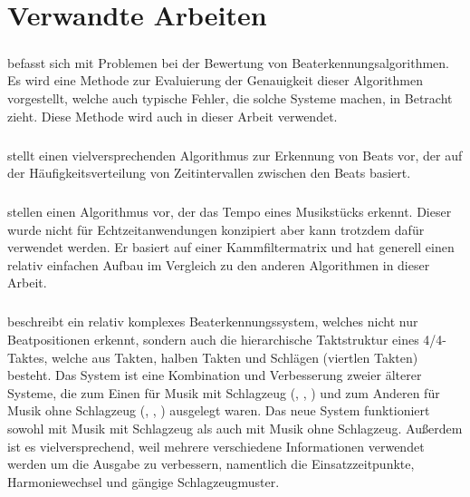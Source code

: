 \chapter{Verwandte Arbeiten}
\label{verwandte_arbeiten}

\paragraph{\cite{1997_GoMu1}}
{
	befasst sich mit Problemen bei der Bewertung von Beaterkennungsalgorithmen.
	Es wird eine Methode zur Evaluierung der Genauigkeit dieser Algorithmen vorgestellt,
		welche auch typische Fehler,
		die solche Systeme machen,
		in Betracht zieht.
	Diese Methode wird auch in dieser Arbeit verwendet.
}


\paragraph{\cite{2000_Di}}
{
	stellt einen vielversprechenden Algorithmus zur Erkennung von Beats vor,
		der auf der Häufigkeitsverteilung von Zeitintervallen zwischen den Beats basiert.
}

\paragraph{\cite{2001_BeatThis}}
{
	stellen einen Algorithmus vor,
		der das Tempo eines Musikstücks erkennt.
	Dieser wurde nicht für Echtzeitanwendungen konzipiert
		aber kann trotzdem dafür verwendet werden.
	Er basiert auf einer Kammfiltermatrix
		und hat generell einen relativ einfachen Aufbau im Vergleich zu den anderen Algorithmen in dieser Arbeit.
}

\paragraph{\cite{2001_Go}}
{
	beschreibt ein relativ komplexes Beaterkennungssystem,
		welches nicht nur Beatpositionen erkennt,
		sondern auch die hierarchische Taktstruktur eines 4/4-Taktes,
		welche aus Takten, halben Takten und Schlägen (viertlen Takten) besteht.
	Das System ist eine Kombination und Verbesserung zweier älterer Systeme,
		die zum Einen für Musik mit Schlagzeug (\cite{1994_GoMu}, \cite{1995_GoMu1}, \cite{1998_GoMu})
		und zum Anderen für Musik ohne Schlagzeug (\cite{1996_GoMu}, \cite{1997_GoMu2}, \cite{1999_GoMu})
		ausgelegt waren.
	Das neue System funktioniert sowohl mit Musik mit Schlagzeug als auch mit Musik ohne Schlagzeug.
	Außerdem ist es vielversprechend,
		weil mehrere verschiedene Informationen verwendet werden um die Ausgabe zu verbessern,
		namentlich die Einsatzzeitpunkte, Harmoniewechsel und gängige Schlagzeugmuster.
}

